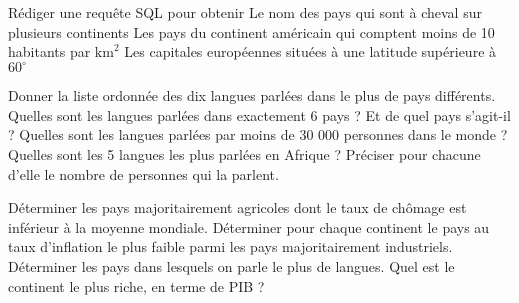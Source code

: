 \begin{enonce}[Jointures]
	Rédiger une requête SQL pour obtenir
	\ssques Le nom des pays qui sont à cheval sur plusieurs continents
	\ssques Les pays du continent américain qui comptent moins de 10 habitants par $ \textrm{km}^2 $
	\ssques Les capitales européennes situées à une latitude supérieure à $ 60^{\circ} $
\end{enonce}

\begin{enonce}
	\ssques Donner la liste ordonnée des dix langues parlées dans le plus de pays différents.
	\ssques Quelles sont les langues parlées dans exactement 6 pays ? Et de quel pays s'agit-il ?
	\ssques Quelles sont les langues parlées par moins de 30 000 personnes dans le monde ?
	\ssques Quelles sont les 5 langues les plus parlées en Afrique ? Préciser pour chacune d'elle le nombre de personnes qui la parlent.
\end{enonce}

\begin{enonce}
	\ssques Déterminer les pays majoritairement agricoles dont le taux de chômage est inférieur à la moyenne mondiale.
	\ssques Déterminer pour chaque continent le pays au taux d'inflation le plus faible parmi les pays majoritairement industriels.
    \ssques Déterminer les pays dans lesquels on parle le plus de langues.
    \ssques Quel est le continent le plus riche, en terme de PIB ?
\end{enonce}
